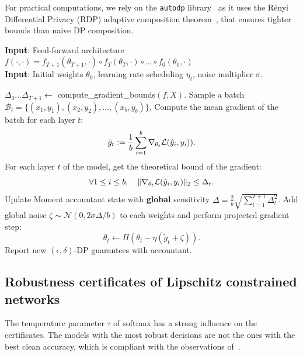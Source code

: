     For practical computations, we rely on the \lstinline[basicstyle=\ttfamily, backgroundcolor=\color{gray!20}]{autodp} library~\citep{wang2019subsampled,zhu2019poission,zhu2020improving} as it uses the R\'enyi Differential Privacy (RDP) adaptive composition theorem~\citep{mironov2017renyi,mironov2019r}, that ensures tighter bounds than naive DP composition.

    \begin{algorithm}%
    \caption{\textbf{Clipless DP-SGD} with \textbf{global} sensitivity accounting}
    \label{alg:noclipdpsgd}
    \textbf{Input}: Feed-forward architecture $f(\cdot,\cdot)=f_{T+1}(\theta_{T+1},\cdot)\circ f_T(\theta_T,\cdot)\circ \ldots \circ f_0(\theta_0,\cdot)$\\
    \textbf{Input}: Initial weights $\theta_0$, learning rate scheduling $\eta_t$, noise multiplier $\sigma$.%
    \begin{algorithmic}[1] %
    \Repeat
        \State $\Delta_0\ldots \Delta_{T+1}\gets $ compute\_gradient\_bounds$(f, X).$
        \State Sample a batch $\mathcal{B}_t=\{(x_1, y_1), (x_2, y_2), \ldots, (x_b, y_b)\}$.
        \State Compute the mean gradient of the batch for each layer $t$: 
            $$\tilde g_{t}\vcentcolon= \frac{1}{b} \sum_{i=1}^b \nabla_{\theta_{t}} \mathcal{L} (\hat y_i,y_i)).$$
        \State For each layer $t$ of the model, get the theoretical bound of the gradient: $$\forall 1 \leq i \leq b,\quad \|\nabla_{\theta_t} \mathcal{L} (\hat y_i,y_i)\|_2 \leq \Delta_t.$$
        \State Update Moment accountant state with \textbf{global} sensitivity $\Delta=\frac{2}{b}\sqrt{\sum_{t=1}^{T+1} \Delta_t^2}$.  
        \State Add global noise $\zeta \sim \mathcal{N}(0,2\sigma \Delta/b)$ to each weights and perform projected gradient step:
            $$\theta_{t}\gets \Pi(\theta_{t}-\eta (\tilde g_{t} + \zeta)).$$
        \State Report new $(\epsilon,\delta)$-DP guarantees with accountant.
    \end{algorithmic}
    \end{algorithm}

\subsection{Robustness certificates of Lipschitz constrained networks}  

    The temperature parameter $\tau$ of softmax has a strong influence on the certificates. The models with the most robust decisions are not the ones with the best clean accuracy, which is compliant with the observations of~\cite{bethune2022pay}.  
    
